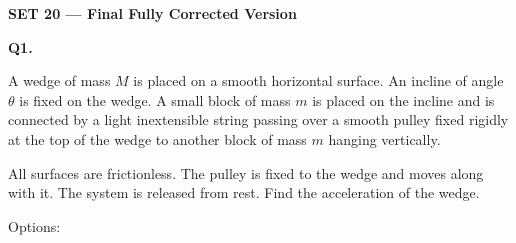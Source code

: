 \documentclass[12pt]{article}
\begin{document}
\begin{flushleft}
{\Large \textbf{SET 20 — Final Fully Corrected Version}}
\end{flushleft}

\vspace{0.5cm}

\textbf{Q1.}

A wedge of mass $M$ is placed on a smooth horizontal surface. 
An incline of angle $\theta$ is fixed on the wedge. 
A small block of mass $m$ is placed on the incline and is connected 
by a light inextensible string passing over a smooth pulley fixed rigidly 
at the top of the wedge to another block of mass $m$ hanging vertically. 

All surfaces are frictionless. The pulley is fixed to the wedge and moves along with it. 
The system is released from rest. 
Find the acceleration of the wedge.

\begin{center}
\end{center}

Options:
\end{document}
